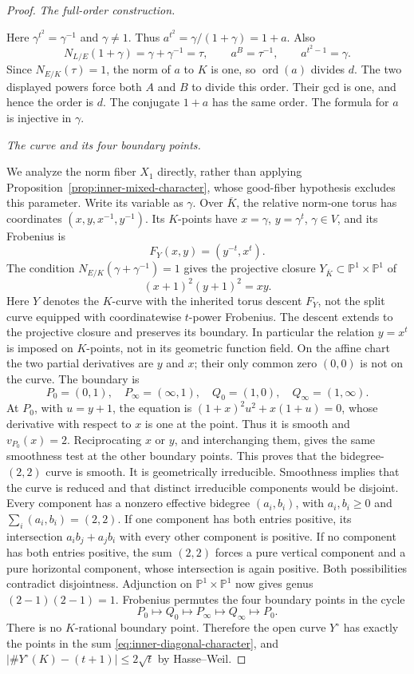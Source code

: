 \documentclass[11pt]{article}
\begin{document}
\begin{proof}
\textit{The full-order construction.}\par
Here $\gamma^{t^2}=\gamma^{-1}$ and $\gamma\ne1$.
Thus $a^{t^2}=\gamma/(1+\gamma)=1+a$.
Also
\[
 N_{L/E}(1+\gamma)=\gamma+\gamma^{-1}=\tau,
 \qquad a^B=\tau^{-1},\qquad a^{t^2-1}=\gamma.
\]
Since $N_{E/K}(\tau)=1$, the norm of $a$ to $K$ is one, so
$\operatorname{ord}(a)$ divides $d$. The two displayed powers
force both $A$ and $B$ to divide this order. Their gcd is one,
and hence the order is $d$. The conjugate $1+a$ has the same
order. The formula for $a$ is injective in $\gamma$.

\smallskip\noindent\textit{The curve and its four boundary points.}\par
We analyze the norm fiber $X_1$ directly, rather than applying
Proposition~\ref{prop:inner-mixed-character}, whose good-fiber
hypothesis excludes this parameter. Write its variable as $\gamma$.
Over $\overline K$, the relative norm-one torus has coordinates
$(x,y,x^{-1},y^{-1})$. Its $K$-points have
$x=\gamma$, $y=\gamma^t$, $\gamma\in V$, and its Frobenius is
\[
 F_Y(x,y)=(y^{-t},x^t).
\]
The condition $N_{E/K}(\gamma+\gamma^{-1})=1$ gives the
projective closure $Y_{\overline K}\subset\mathbb P^1\times\mathbb P^1$ of
\begin{equation}\label{eq:inner-diagonal-curve}
 (x+1)^2(y+1)^2=xy.
\end{equation}
Here $Y$ denotes the $K$-curve with the inherited torus descent
$F_Y$, not the split curve equipped with coordinatewise
$t$-power Frobenius. The descent extends to the projective
closure and preserves its boundary. In particular the relation
$y=x^t$ is imposed on $K$-points, not in its geometric function field.
On the affine chart the two partial derivatives are $y$ and $x$;
their only common zero $(0,0)$ is not on the curve. The boundary is
\[
 P_0=(0,1),\quad P_\infty=(\infty,1),\quad
 Q_0=(1,0),\quad Q_\infty=(1,\infty).
\]
At $P_0$, with $u=y+1$, the equation is
$(1+x)^2u^2+x(1+u)=0$, whose derivative with respect to $x$
is one at the point. Thus it is smooth and $v_{P_0}(x)=2$.
Reciprocating $x$ or $y$, and interchanging them, gives the
same smoothness test at the other boundary points.
This proves that the bidegree-$(2,2)$ curve is smooth.
It is geometrically irreducible. Smoothness implies that
the curve is reduced and that distinct irreducible components
would be disjoint. Every component has a nonzero effective
bidegree $(a_i,b_i)$, with $a_i,b_i\ge0$ and
$\sum_i(a_i,b_i)=(2,2)$. If one component has both entries
positive, its intersection $a_ib_j+a_jb_i$ with every other
component is positive. If no component has both entries
positive, the sum $(2,2)$ forces a pure vertical component
and a pure horizontal component, whose intersection is again
positive. Both possibilities contradict disjointness.
Adjunction on $\mathbb P^1\times\mathbb P^1$ now gives genus
$(2-1)(2-1)=1$.
Frobenius permutes the four boundary points in the cycle
\[
 P_0\longmapsto Q_0\longmapsto P_\infty
      \longmapsto Q_\infty\longmapsto P_0.
\]
There is no $K$-rational boundary point. Therefore the open curve
$Y^\circ$ has exactly the points in the sum
\eqref{eq:inner-diagonal-character}, and
$|\#Y^\circ(K)-(t+1)|\le2\sqrt t$ by Hasse--Weil.


\end{proof}
\end{document}
